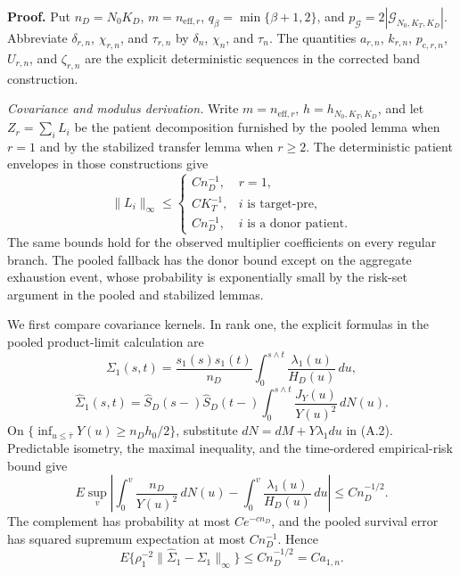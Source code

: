 \textbf{Proof.}
Put \(n_D=N_0K_D\), \(m=n_{\mathrm{eff},r}\),
\(q_\beta=\min\{\beta+1,2\}\), and
\(p_{\mathcal G}=2|\mathcal G_{N_0,K_T,K_D}|\).  Abbreviate
\(\delta_{r,n}\), \(\chi_{r,n}\), and \(\tau_{r,n}\) by
\(\delta_n\), \(\chi_n\), and \(\tau_n\).  The quantities
\(a_{r,n}\), \(k_{r,n}\), \(p_{\mathrm c,r,n}\), \(U_{r,n}\), and
\(\zeta_{r,n}\) are the explicit deterministic sequences in the corrected
band construction.

\emph{Covariance and modulus derivation.}
Write \(m=n_{\mathrm{eff},r}\), \(h=h_{N_0,K_T,K_D}\), and let \(Z_r=\sum_iL_i\) be the patient decomposition furnished by the pooled lemma when \(r=1\) and by the stabilized transfer lemma when \(r\ge2\). The deterministic patient envelopes in those constructions give
\[
 \|L_i\|_\infty\le
 \begin{cases}
 Cn_D^{-1},&r=1,\\
 CK_T^{-1},&i\text{ is target-pre},\\
 Cn_D^{-1},&i\text{ is a donor patient}.
 \end{cases}                                                   \tag{A.1}
\]
The same bounds hold for the observed multiplier coefficients on every regular branch. The pooled fallback has the donor bound except on the aggregate exhaustion event, whose probability is exponentially small by the risk-set argument in the pooled and stabilized lemmas.

We first compare covariance kernels. In rank one, the explicit formulas in the pooled product-limit calculation are
\[
 \Sigma_1(s,t)=\frac{s_1(s)s_1(t)}{n_D}
 \int_0^{s\wedge t}\frac{\lambda_1(u)}{H_D(u)}\,du,
\]
\[
 \widehat\Sigma_1(s,t)=\widehat S_D(s-)\widehat S_D(t-)
 \int_0^{s\wedge t}\frac{J_Y(u)}{Y(u)^2}\,dN(u).          \tag{A.2}
\]
On \(\{\inf_{u\le\bar\tau}Y(u)\ge n_Dh_0/2\}\), substitute \(dN=dM+Y\lambda_1du\) in (A.2). Predictable isometry, the maximal inequality, and the time-ordered empirical-risk bound give
\[
 E\sup_v\left|
 \int_0^v\frac{n_D}{Y(u)^2}\,dN(u)
 -\int_0^v\frac{\lambda_1(u)}{H_D(u)}\,du
 \right|\le Cn_D^{-1/2}.                                  \tag{A.3}
\]
The complement has probability at most \(Ce^{-cn_D}\), and the pooled survival error has squared supremum expectation at most \(Cn_D^{-1}\). Hence
\[
 E\{\rho_1^{-2}\|\widehat\Sigma_1-\Sigma_1\|_\infty\}
 \le Cn_D^{-1/2}=Ca_{1,n}.                                \tag{A.4}
\]

